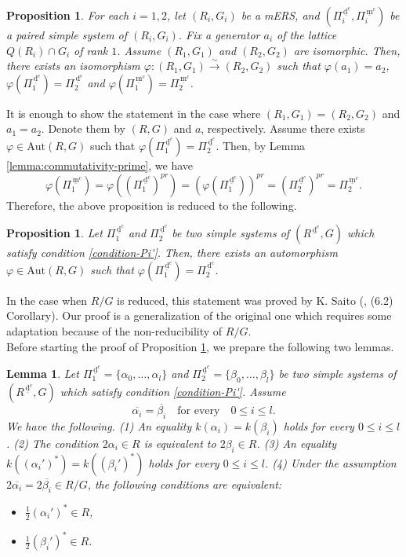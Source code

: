 \documentclass[11pt]{amsart}
\newcommand{\Aut}{\mathrm{Aut}}
\newcommand{\dc}{\,\underline{\mathrm{d}}^c}
\newcommand{\mc}{\, \underline{\mathrm{m}}^c}
\newtheorem{prop}[thm]{Proposition}%
\newtheorem{lemma}[thm]{Lemma}%
\begin{document}
{\begin{prop}\label{prop:nr-counting-Autom1}
For each $i=1,2$, let $(R_i,G_i)$ be a mERS, and 
$(\Pi^{\dc}_i,\Pi^{\mc}_i)$ be a paired simple system of $(R_i,G_i)$. 
Fix a generator $a_i$ of the lattice $Q(R_i)\cap G_i$ of rank $1$. 
Assume $(R_1,G_1)$ and
$(R_2,G_2)$ are isomorphic. Then, there exists an isomorphism
$\varphi:(R_1,G_1)\xrightarrow{\sim}(R_2,G_2)$ such that 
$\varphi(a_1)=a_2$, 
$\varphi(\Pi_1^{\dc})=\Pi_2^{\dc}$ and $\varphi(\Pi_1^{\mc})=\Pi_2^{\mc}$. 
\end{prop}

It is enough to show the statement in the case where $(R_1,G_1)=(R_2,G_2)$
and $a_1=a_2$. Denote them by $(R,G)$ and $a$, respectively. 
Assume there exists $\varphi\in \Aut(R,G)$ such that 
$\varphi(\Pi_1^{\dc})=\Pi_2^{\dc}$. 
Then, by Lemma \ref{lemma:commutativity-prime}, we have
\[\varphi(\Pi^{\mc}_1)=\varphi((\Pi_1^{\dc})^{pr})=(\varphi(\Pi_1^{\dc}))^{pr}=(\Pi_2^{\dc})^{pr}=\Pi_2^{\mc}.\]
Therefore, the above proposition is reduced to the following.

\begin{prop}\label{prop:nr-counting-Autom2}
Let $\Pi^{\dc}_1$ and $\Pi_2^{\dc}$ be two simple systems of $(R^{\dc},G)$ which
satisfy condition \eqref{condition-Pi'}. 
Then, there exists an automorphism $\varphi\in \Aut(R,G)$ such that 
$\varphi(\Pi^{\dc}_1)=\Pi_2^{\dc}$. 
\end{prop}

In the case when $R/G$ is reduced, this statement was proved by K. Saito 
(\cite{Saito1985}, (6.2) Corollary). 
Our proof is a generalization of the original one which requires 
some adaptation because of the non-reducibility of $R/G$.\\

Before starting the proof of Proposition \ref{prop:nr-counting-Autom2}, we 
prepare the following two lemmas.
\begin{lemma}\label{lemma:nr-counting-Autom3}
Let $\Pi^{\dc}_1=\{\alpha_0,\ldots,\alpha_l\}$ and $\Pi_2^{\dc}=\{\beta_0,\ldots,\beta_l\}$ 
be two simple systems of $(R^{\dc},G)$ which satisfy condition \eqref{condition-Pi'}. 
Assume
\begin{equation}\label{assumtion:alpha=beta}
\overline{\alpha_i}=\overline{\beta_i}\quad\text{for every}\quad 0\leq i\leq l.
\end{equation}
We have the following.
\vskip 1mm
\noindent
{\rm (1)} An equality $k(\alpha_i)=k(\beta_i)$ holds for every $0\leq i\leq l$. 
\vskip 1mm
\noindent
{\rm (2)} The condition $2\alpha_i\in R$ is equivalent to $2\beta_i\in R$.
\vskip 1mm
\noindent
{\rm (3)} An equality $k((\alpha_i')^\ast)=k((\beta_i')^\ast)$ holds for every 
$0\leq i\leq l$.
\vskip 1mm
\noindent
{\rm (4)} Under the assumption  $2\overline{\alpha_i}=2\overline{\beta_i}\in R/G$, 
the following conditions are equivalent{\rm :}  
\begin{itemize}
\item[(a)] $\frac12 (\alpha_i')^\ast\in R$,
\vskip 1mm
\item[(b)] $\frac12 (\beta_i')^\ast\in R$. 
\end{itemize}
\end{lemma}

}
\end{document}
